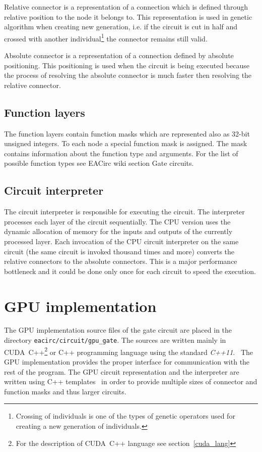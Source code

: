 \documentclass[12pt,twoside]{fithesis2}
\begin{document}
Relative connector is a representation of a connection which is defined through relative position to the node it belongs to. This representation is used in genetic algorithm when creating new generation, i.e. if the circuit is cut in half and crossed with another individual\footnote{Crossing of individuals is one of the types of genetic operators used for creating a new generation of individuals.} the connector remains still valid.

Absolute connector is a representation of a connection defined by absolute positioning. This positioning is used when the circuit is being executed because the process of resolving the absolute connector is much faster then resolving the relative connector.

\subsection{Function layers}

The function layers contain function masks which are represented also as 32-bit unsigned integers. To each node a special function mask is assigned. The mask contains information about the function type and arguments. For the list of possible function types see EACirc wiki section Gate circuits.~\cite{eacirc_circuit}

\subsection{Circuit interpreter}

The circuit interpreter is responsible for executing the circuit. The interpreter processes each layer of the circuit sequentially. The CPU version uses the dynamic allocation of memory for the inputs and outputs of the currently processed layer. Each invocation of the CPU circuit interpreter on the same circuit (the same circuit is invoked thousand times and more) converts the relative connectors to the absolute connectors. This is a major performance bottleneck and it could be done only once for each circuit to speed the execution.


\section{GPU implementation}

The GPU implementation source files of the gate circuit are placed in the directory \texttt{eacirc/circuit/gpu\_gate}. The sources are written mainly in CUDA~C++\footnote{For the description of CUDA~C++ language see section~\ref{cuda_lang}} or C++ programming language using the standard \emph{C++11}.~\cite{std_c++11, cuda_guide} The GPU implementation provides the proper interface for communication with the rest of the program. The GPU circuit representation and the interpreter are written using C++ templates~\cite{std_c++11} in order to provide multiple sizes of connector and function masks and thus larger circuits.
\end{document}
